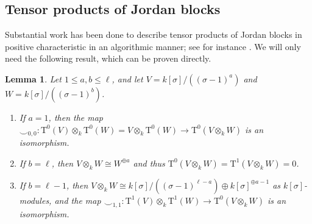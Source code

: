 \documentclass[reqno]{amsart}
\numberwithin{equation}{subsection}
\newcommand{\co}{\colon}
\newcommand{\rT}{\ensuremath{\mathrm{T}}\xspace}
\newtheorem{lemma}[thm]{Lemma}
\theoremstyle{remark}
\numberwithin{equation}{subsection}
\numberwithin{figure}{subsection}
\begin{document}
\subsection{Tensor products of Jordan blocks}

Substantial work has been done to describe tensor products of Jordan blocks in positive characteristic in an algorithmic manner; see for instance \cite{Sri64}. We will only need the following result, which can be proven directly.


\begin{lemma}\label{lemma:tate-cohom-edge-cases}
Let $1 \leq a, b \leq \ell$, and let $V = k[\sigma]/((\sigma-1)^a)$ and $W = k[\sigma]/((\sigma-1)^b)$.
\begin{enumerate}
    \item If $a = 1$, then the map $\smile_{0,0}\co \rT^0(V) \otimes_k \rT^0(W) = V \otimes_k \rT^0(W) \to \rT^0(V \otimes_k W)$ is an isomorphism.
    \item If $b = \ell$, then $V \otimes_k W \cong W^{\oplus a}$ and thus $\rT^0(V \otimes_k W) = \rT^1(V \otimes_k W) = 0$.
    \item If $b = \ell - 1$, then $V \otimes_k W \cong k[\sigma]/((\sigma-1)^{\ell-a}) \oplus k[\sigma]^{\oplus a-1}$ as $k[\sigma]$-modules, and the map $\smile_{1,1}\co \rT^1(V) \otimes_k \rT^1(W) \to \rT^0(V \otimes_k W)$ is an isomorphism.
\end{enumerate}
\end{lemma}
\end{document}
